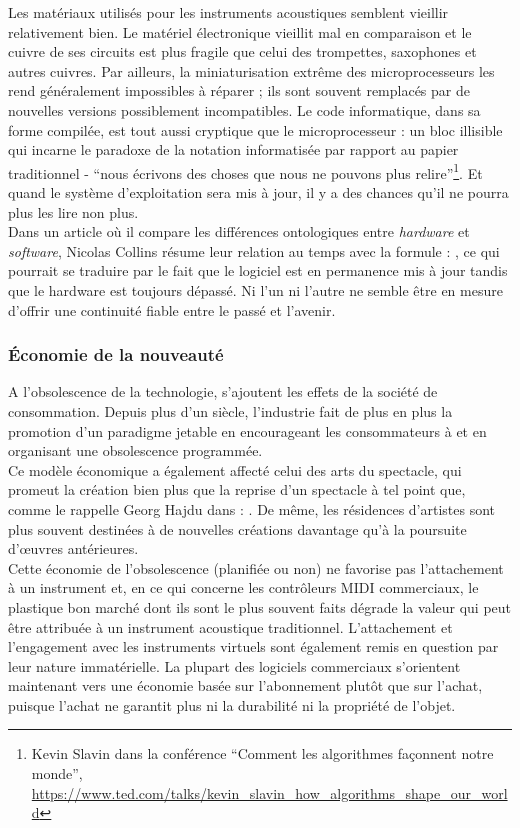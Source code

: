 \noindent Les matériaux utilisés pour les instruments acoustiques semblent vieillir relativement bien. Le matériel électronique vieillit mal en comparaison et le cuivre de ses circuits est plus fragile que celui des trompettes, saxophones et autres cuivres. Par ailleurs, la miniaturisation extrême des microprocesseurs les rend généralement impossibles à réparer ; ils sont souvent remplacés par de nouvelles versions possiblement incompatibles. Le code informatique, dans sa forme compilée, est tout aussi cryptique que le microprocesseur : un bloc illisible qui incarne le paradoxe de la notation informatisée par rapport au papier traditionnel - ``nous écrivons des choses que nous ne pouvons plus relire''\footnote{Kevin Slavin dans la conférence ``Comment les algorithmes façonnent notre monde'', \url{https://www.ted.com/talks/kevin_slavin_how_algorithms_shape_our_world}}. Et quand le système d'exploitation sera mis à jour, il y a des chances qu'il ne pourra plus les lire non plus.\\
\indent Dans un article où il compare les différences ontologiques entre \textit{hardware} et \textit{software}, Nicolas Collins \cite{collins_semiconducting_2013} résume leur relation au temps avec la formule : , ce qui pourrait se traduire par le fait que le logiciel est en permanence mis à jour tandis que le hardware est toujours dépassé. Ni l'un ni l'autre ne semble être en mesure d'offrir une continuité fiable entre le passé et l'avenir.

	
\subsubsection{Économie de la nouveauté}

\noindent A l'obsolescence de la technologie, s'ajoutent les effets de la société de consommation. Depuis plus d'un siècle, l'industrie fait de plus en plus la promotion d'un paradigme jetable en encourageant les consommateurs à  \cite{slade_made_2006} et en organisant une obsolescence programmée.\\
\indent Ce modèle économique a également affecté celui des arts du spectacle, qui promeut la création bien plus que la reprise d'un spectacle à tel point que, comme le rappelle Georg Hajdu dans \cite{hajdu_disposable_2016} : . De même, les résidences d'artistes sont plus souvent destinées à de nouvelles créations davantage qu'à la poursuite d'œuvres antérieures.\\
\indent Cette économie de l'obsolescence (planifiée ou non) ne favorise pas l'attachement à un instrument et, en ce qui concerne les contrôleurs \gls{MIDI} commerciaux, le plastique bon marché dont ils sont le plus souvent faits dégrade la valeur qui peut être attribuée à un instrument acoustique traditionnel. L'attachement et l'engagement avec les instruments virtuels sont également remis en question par leur nature immatérielle. La plupart des logiciels commerciaux s'orientent maintenant vers une économie basée sur l'abonnement plutôt que sur l'achat, puisque l'achat ne garantit plus ni la durabilité ni la propriété de l'objet.

